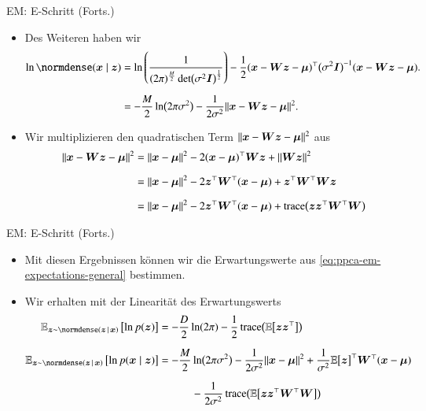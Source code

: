 \begin{frame}{EM: E-Schritt (Forts.)}{}
	\begin{itemize}
		\item Des Weiteren haben wir
		\begin{equation}
			\begin{aligned}
				\ln \normdense(\bx \mid \bz)
					&= \ln\left( \frac{1}{(2 \pi)^\frac{M}{2} \det\bigl( \sigma^2 \bI \bigr)^\frac{1}{2}} \right)
						- \frac{1}{2} (\bx - \bW \bz - \bmu)^\top \bigl( \sigma^2 \bI \bigr)^{-1} (\bx - \bW \bz - \bmu).
			\\[2mm]
					&= -\frac{M}{2} \ln\bigl( 2 \pi \sigma^2 \bigr) - \frac{1}{2 \sigma^2} \Vert \bx - \bW \bz - \bmu \Vert^2.
			\end{aligned}
		\end{equation}
		\item Wir multiplizieren den quadratischen Term $\Vert \bm{x} - \bm{W} \bm{z} - \bm{\mu} \Vert^2$ aus
		\begin{equation}
			\begin{aligned}
				\Vert \bm{x} - \bm{W} \bm{z} - \bm{\mu} \Vert^2
					&= \Vert \bm{x} - \bm{\mu} \Vert^2 - 2 (\bm{x} - \bm{\mu})^\top \bm{W} \bm{z} + \Vert \bm{W} \bm{z} \Vert^2
			\\[2mm]
					&= \Vert \bm{x} - \bm{\mu} \Vert^2 - 2 \bm{z}^\top \bm{W}^\top (\bm{x} - \bm{\mu}) + \bm{z}^\top \bm{W}^\top \bm{W} \bm{z}
			\\[2mm]
					&= \Vert \bm{x} - \bm{\mu} \Vert^2 - 2 \bm{z}^\top \bm{W}^\top (\bm{x} - \bm{\mu}) + \operatorname{\text{trace}}\bigl( \bm{z} \bm{z}^\top \bm{W}^\top \bm{W} \bigr)
			\end{aligned}
		\end{equation}
	\end{itemize}
\end{frame}


\begin{frame}{EM: E-Schritt (Forts.)}{}
	\begin{itemize}
		\item Mit diesen Ergebnissen können wir die Erwartungswerte aus \eqref{eq:ppca-em-expectations-general} bestimmen.
		\item Wir erhalten mit der Linearität des Erwartungswerts
		\begin{equation}
			\begin{aligned}
				\E_{\bz \sim \normdense(\bz\,\mid\,\bx)}\left[ \ln p(\bz) \right]
					&= -\frac{D}{2} \ln(2 \pi) - \frac{1}{2} \trace\bigl( \E\bigl[ \bz \bz^\top \bigr] \bigr)
			\\[2mm]
				\E_{\bz \sim \normdense(\bz\,\mid\,\bx)}\left[ \ln p(\bx \mid \bz) \right]
					&= -\frac{M}{2} \ln\bigl( 2 \pi \sigma^2 \bigr) - \frac{1}{2 \sigma^2} \Vert \bx - \bmu \Vert^2
						+ \frac{1}{\sigma^2} \E\bigl[ \bz \bigr]^\top \bW^\top (\bx - \bmu)
			\\[2mm]
					&\qquad\quad - \frac{1}{2 \sigma^2} \trace\bigl( \E\bigl[ \bz \bz^\top \bW^\top \bW \bigr] \bigr)
			\end{aligned}
		\end{equation}
	\end{itemize}
\end{frame}


